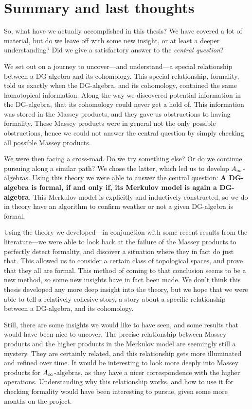 \clearpage
\section{Summary and last thoughts}

So, what have we actually accomplished in this thesis? We have covered a lot of material, but do we leave off with some new insight, or at least a deeper understanding? Did we give a satisfactory answer to the \emph{central question}?

We set out on a journey to uncover---and understand---a special relationship between a DG-algebra and its cohomology. This special relationship, formality, told us exactly when the DG-algebra, and its cohomology, contained the same homotopical information. Along the way we discovered potential information in the DG-algebra, that its cohomology could never get a hold of. This information was stored in the Massey products, and they gave us obstructions to having formality. These Massey products were in general not the only possible obstructions, hence we could not answer the central question by simply checking all possible Massey products. 

We were then facing a cross-road. Do we try something else? Or do we continue pursuing along a similar path? We chose the latter, which led us to develop $A_{\infty}$-algebras. Using this theory we were able to answer the central question: \textbf{A DG-algebra is formal, if and only if, its Merkulov model is again a DG-algebra}. This Merkulov model is explicitly and inductively constructed, so we do in theory have an algorithm to confirm weather or not a given DG-algebra is formal. 

Using the theory we developed---in conjunction with some recent results from the literature---we were able to look back at the failure of the Massey products to perfectly detect formality, and discover a situation where they in fact do just that. This allowed us to consider a certain class of topological spaces, and prove that they all are formal. This method of coming to that conclusion seems to be a new method, so some new insights have in fact been made. We don't think this thesis developed any more deep insight into the theory, but we hope that we were able to tell a relatively cohesive story, a story about a specific relationship between a DG-algebra, and its cohomology. 

Still, there are some insights we would like to have seen, and some results that would have been nice to uncover. The precise relationship between Massey products and the higher products in the Merkulov model are seemingly still a mystery. They are certainly related, and this relationship gets more illuminated and refined over time. It would be interesting to look more deeply into Massey products for $A_{\infty}$-algebras, as they have a nicer correspondence with the higher operations. Understanding why this relationship works, and how to use it for checking formality would have been interesting to pursue, given some more months on the project. 

